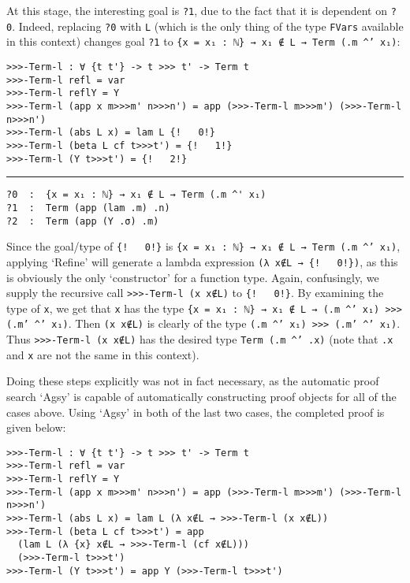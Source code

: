 \documentclass[a4paper, 12pt, twoside]{style/ociamthesis}
\theoremstyle{plain}
\theoremstyle{definition}
\theoremstyle{remark}
\begin{document}
At this stage, the interesting goal is \texttt{?1}, due to the fact that
it is dependent on \texttt{?0}. Indeed, replacing \texttt{?0} with
\texttt{L} (which is the only thing of the type \texttt{FVars} available
in this context) changes goal \texttt{?1} to
\texttt{\{x = x₁ : ℕ\} → x₁ ∉ L → Term (.m \textasciicircum' x₁)}:

\begin{verbatim}
>>>-Term-l : ∀ {t t'} -> t >>> t' -> Term t
>>>-Term-l refl = var
>>>-Term-l reflY = Y
>>>-Term-l (app x m>>>m' n>>>n') = app (>>>-Term-l m>>>m') (>>>-Term-l n>>>n')
>>>-Term-l (abs L x) = lam L {!   0!}
>>>-Term-l (beta L cf t>>>t') = {!   1!}
>>>-Term-l (Y t>>>t') = {!   2!}
\end{verbatim}

\noindent\rule{8cm}{0.4pt}

\begin{verbatim}
?0  :  {x = x₁ : ℕ} → x₁ ∉ L → Term (.m ^' x₁)
?1  :  Term (app (lam .m) .n)
?2  :  Term (app (Y .σ) .m)
\end{verbatim}

Since the goal/type of \texttt{\{!\ \ \ 0!\}} is
\texttt{\{x = x₁ : ℕ\} → x₁ ∉ L → Term (.m \textasciicircum' x₁)},
applying `Refine' will generate a lambda expression
\texttt{(λ x∉L → \{!\ \ \ 0!\})}, as this is obviously the only
`constructor' for a function type. Again, confusingly, we supply the
recursive call \texttt{>>>-Term-l (x x∉L)} to \texttt{\{!\ \ \ 0!\}}. By
examining the type of \texttt{x}, we get that \texttt{x} has the type
\texttt{\{x = x₁ : ℕ\} → x₁ ∉ L → (.m \textasciicircum' x₁) >>> (.m' \textasciicircum' x₁)}.
Then \texttt{(x x∉L)} is clearly of the type
\texttt{(.m \textasciicircum' x₁) >>> (.m' \textasciicircum' x₁)}. Thus
\texttt{>>>-Term-l (x x∉L)} has the desired type
\texttt{Term (.m \textasciicircum' .x)} (note that \texttt{.x} and
\texttt{x} are not the same in this context).

Doing these steps explicitly was not in fact necessary, as the automatic
proof search `Agsy' is capable of automatically constructing proof
objects for all of the cases above. Using `Agsy' in both of the last two
cases, the completed proof is given below:

\begin{verbatim}
>>>-Term-l : ∀ {t t'} -> t >>> t' -> Term t
>>>-Term-l refl = var
>>>-Term-l reflY = Y
>>>-Term-l (app x m>>>m' n>>>n') = app (>>>-Term-l m>>>m') (>>>-Term-l n>>>n')
>>>-Term-l (abs L x) = lam L (λ x∉L → >>>-Term-l (x x∉L))
>>>-Term-l (beta L cf t>>>t') = app 
  (lam L (λ {x} x∉L → >>>-Term-l (cf x∉L))) 
  (>>>-Term-l t>>>t')
>>>-Term-l (Y t>>>t') = app Y (>>>-Term-l t>>>t')
\end{verbatim}
\end{document}
